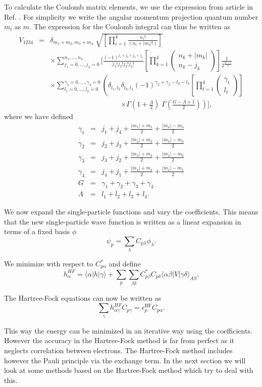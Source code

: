 	To calculate the Coulomb matrix elements, we use the expression from article in Ref. \cite{AnisimovasQD}. For simplicity we write the angular momentum projection quantum number $m_{l}$ as $m$. The expression for the Coulomb integral can thus be written as
	\begin{eqnarray*}
		V_{1234} & = & \delta_{m_1+m_2,m_3+m_4} \; \sqrt{ \left[ \prod_{i=1}^4 \frac{n_i !}{(n_i+|m_i|!)} \right] } \\
		& & \times \sum_{j_1=0,\dots,j_4=0}^{n_1,\dots,n_4} \Bigg[ \frac{(-1)^{j_1+j_2+j_3+j_4}} {j_1!j_2!j_3!j_4!} \left[ \prod_{k=1}^4 
		\begin{pmatrix} 
			n_k+|m_k|\\n_k-j_k
		\end{pmatrix}  
		\right] \frac{1}{2^{\frac{G+1}{2}}} \\
		& & \times  \sum_{l_1=0,\dots,l_4=0}^{\gamma_1=0,\dots,\gamma_4=0} \left( \delta_{l_1,l_2}  \delta_{l_3,l_4}  (-1)^{\gamma_2+\gamma_3-l_2-l_3} \left[ \prod_{t=1}^4 \begin{pmatrix} \gamma_t \\
		l_t\end{pmatrix} \right] \right. \\
		& & \qquad \qquad \qquad \qquad \qquad \left. \times \Gamma \left(1+\frac{\Lambda}{2} \right) \; \Gamma \left(\frac{G - \Lambda +1}{2}\right)    \right)  \Bigg],
	\end{eqnarray*}
	where we have defined
	\begin{eqnarray*}
		\gamma_{1} & = & j_{1}+j_{4}+\frac{|m_{1}|+m_{1}}{2}+\frac{|m_{4}|-m_{4}}{2}\\
		\gamma_{2} & = & j_{2}+j_{3}+\frac{|m_{2}|+m_{2}}{2}+\frac{|m_{3}|-m_{3}}{2}\\
		\gamma_{3} & = & j_{3}+j_{2}+\frac{|m_{3}|+m_{3}}{2}+\frac{|m_{2}|-m_{2}}{2}\\
		\gamma_{4} & = & j_{4}+j_{1}+\frac{|m_{4}|+m_{4}}{2}+\frac{|m_{1}|-m_{1}}{2}\\
		G & = & \gamma_{1}+\gamma_{2}+\gamma_{3}+\gamma_{4}\\
		\Lambda & = & l_{1}+l_{2}+l_{3}+l_{4}.
	\end{eqnarray*}

	We now expand the single-particle functions and vary the coefficients. This means that the new single-particle wave function is written as a linear expansion in terms of a fixed basis $\phi$
	\[
	\psi_{p}=\sum_{\lambda}C_{p\lambda}\phi_{\lambda}.
	\]

	We minimize with respect to $C_{p\alpha}^{*}$ and define
	\[
	h_{\alpha}^{HF}=\langle\alpha|h|\gamma\rangle+\sum_{p}\sum_{\beta\delta}C_{p\beta}^{*}C_{p\delta}\langle\alpha\beta|V|\gamma\delta\rangle_{AS}.
	\]

	The Hartree-Fock equations can now be written as 
	\[
	\sum_{\gamma}h_{\alpha\gamma}^{HF}C_{p\gamma}=\epsilon_{p}^{\mathrm{HF}}C_{p\alpha}.
	\]

	This way the energy can be minimized in an iterative way using the coefficients. However the accuracy in the Hartree-Fock method is far from perfect as it neglects correlation between electrons. The Hartree-Fock method includes however the Pauli principle via the exchange term. In the next section we will look at some methods based on the  Hartree-Fock method which try to deal with this.
